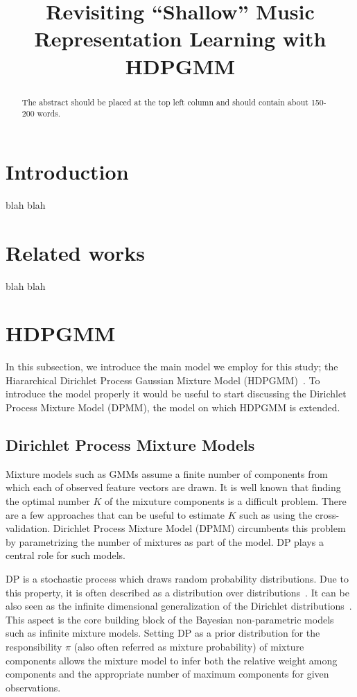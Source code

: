 \documentclass{article}
\title{Revisiting ``Shallow'' Music Representation Learning with HDPGMM}
\begin{document}
%
\maketitle
%
\begin{abstract}
The abstract should be placed at the top left column and should contain about 150-200 words.
\end{abstract}
%
\section{Introduction}\label{sec:introduction}

blah blah
%

\section{Related works}\label{sec:rel_works}

blah blah
%
\section{HDPGMM}\label{sec:hdpgmm}

In this subsection, we introduce the main model we employ for this study; the Hiararchical Dirichlet Process Gaussian Mixture Model (HDPGMM)~\cite{DBLP:conf/ismir/HoffmanBC08, doi:10.1198/016214506000000302}. To introduce the model properly it would be useful to start discussing the Dirichlet Process Mixture Model (DPMM), the model on which HDPGMM is extended.

\subsection{Dirichlet Process Mixture Models}\label{sec:hdpgmm:dpmm}

Mixture models such as GMMs assume a finite number of components from which each of observed feature vectors are drawn. It is well known that finding the optimal number $K$ of the mixuture components is a difficult problem. There are a few approaches that can be useful to estimate $K$ such as using the cross-validation. Dirichlet Process Mixture Model (DPMM) circumbents this problem by parametrizing the number of mixtures as part of the model. DP plays a central role for such models.

DP is a stochastic process which draws random probability distributions. Due to this property, it is often described as a distribution over distributions~\cite{DBLP:reference/ml/Teh17}. It can be also seen as the infinite dimensional generalization of the Dirichlet distributions~\cite{DBLP:reference/ml/Teh17}.
This aspect is the core building block of the Bayesian non-parametric models such as infinite mixture models. Setting DP as a prior distribution for the responsibility $\pi$ (also often referred as mixture probability) of mixture components allows the mixture model to infer both the relative weight among components and the appropriate number of maximum components for given observations.
\end{document}
